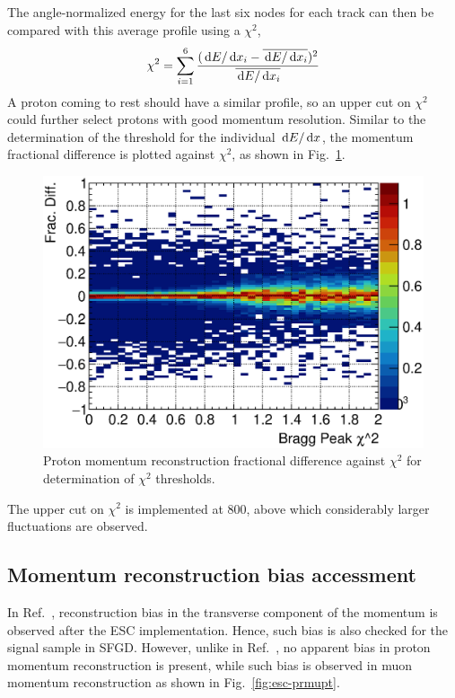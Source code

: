      The angle-normalized energy for the last six nodes for each track can then be compared with this average profile using a $\chi^2$,
    \begin{equation}
    \chi^2 = \sum_{i=1}^{6} \frac{(\,\textrm{d}E/\,\textrm{d}x_i - \overline{\,\textrm{d}E/\,\textrm{d}x_i})^2}{\overline{\,\textrm{d}E/\,\textrm{d}x_i}}
    \end{equation}
    A proton coming to rest should have a similar profile, so an upper cut on $\chi^2$ could further select protons with good momentum resolution. 
    Similar to the determination of the threshold for the individual $\,\textrm{d}E/\,\textrm{d}x$, the momentum fractional difference is plotted against $\chi^2$, as shown in Fig.~\ref{fig:esc-mom-res-chi2}.
    \begin{figure}[h]
       \centering
       \includegraphics[width=\sgfidwid\textwidth]{figures/sel/brchi2_colnor_vs_p_pr_res_hist2d_al2_selpr_con_test.eps} 
       \caption{Proton momentum reconstruction fractional difference against $\chi^2$ for determination of $\chi^2$ thresholds.}
       \label{fig:esc-mom-res-chi2}
    \end{figure}
    The upper cut on $\chi^2$ is implemented at $800$, above which considerably larger fluctuations are observed.

    \subsection{Momentum reconstruction bias accessment}
    \label{sec:sel-esc-bias}
     In Ref.~\cite{Lu:2016mjf}, reconstruction bias in the transverse component of the momentum is observed after the ESC implementation.
     Hence, such bias is also checked for the signal sample in SFGD.
     However, unlike in Ref.~\cite{Lu:2016mjf}, no apparent bias in proton momentum reconstruction is present, while such bias is observed in muon momentum reconstruction as shown in Fig.~\ref{fig:esc-prmupt}.

